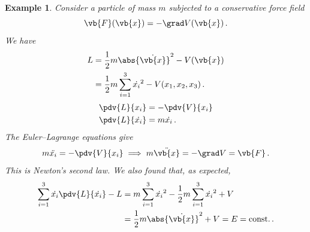 \documentclass{article}
\theoremstyle{plain}\theoremheaderfont{\normalfont\itshape}\theorembodyfont{\rmfamily}\theoremseparator{.}\newtheorem*{rem}{Remark}\newtheorem*{ex}{Example}\newtheorem*{proof}{Proof}\newtheorem*{altp}{Alternative proof}
\theoremstyle{plain}\theoremheaderfont{\normalfont\bfseries}\theorembodyfont{\rmfamily}\theoremseparator{.}\newtheorem{thm}{Theorem}[section]\newtheorem{lem}[thm]{Lemma}\newtheorem{prop}[thm]{Proposition}\newtheorem*{cor}{Corollary}\newtheorem{defn}[thm]{Definition}\newtheorem{clm}[thm]{Claim}\newtheorem{clminproof}{Claim}
\theoremstyle{break}\theoremheaderfont{\normalfont\itshape}\theorembodyfont{\rmfamily}\theoremseparator{.\medskip}\newtheorem*{proofskip}{Proof}\newtheorem*{exs}{Examples}\newtheorem*{rems}{Remarks}
\theoremstyle{break}\theoremheaderfont{\normalfont\bfseries}\theorembodyfont{\rmfamily}\theoremseparator{.\medskip}\newtheorem{lemskip}[thm]{Lemma}\newtheorem{defnskip}[thm]{Definition}\newtheorem{propskip}[thm]{Proposition}\newtheorem{thmskip}[thm]{Theorem}
\numberwithin{equation}{section}
\begin{document}
	\begin{ex}
		Consider a particle of mass \(m\) subjected to a conservative force field
		\[\vb{F}(\vb{x})=-\grad V(\vb{x})\,.\]
		We have
		\begin{align*}
			L&=\frac{1}{2}m\abs{\dot{\vb{x}}}^2-V(\vb{x})\\
			&=\frac{1}{2}m\sum_{i=1}^{3}\dot{x_i}^2-V(x_1,x_2,x_3)\,.
		\end{align*}
		\begin{align*}
			\pdv{L}{x_i}&=-\pdv{V}{x_i}\\
			\pdv{L}{\dot{x_i}}&=m\dot{x_i}\,.
		\end{align*}
		The Euler--Lagrange equations give
		\[m\ddot{x_i}=-\pdv{V}{x_i}\implies m\ddot{\vb{x}}=-\grad V=\vb{F}\,.\]
		This is Newton's second law. We also found that, as expected,
		\begin{align*}
			\sum_{i=1}^{3}\dot{x_i}\pdv{L}{\dot{x_i}}-L&=m\sum_{i=1}^{3}\dot{x_i}^2-\frac{1}{2}m\sum_{i=1}^{3}\dot{x_i}^2+V\\
			&=\frac{1}{2}m\abs{\dot{\vb{x}}}^2+V=E=\text{const.}\,.
		\end{align*}
	\end{ex}
\end{document}

